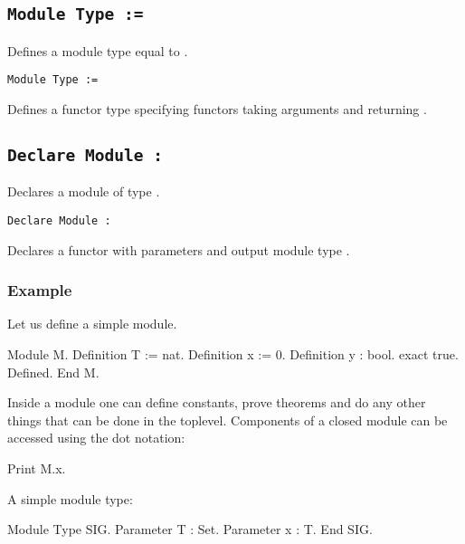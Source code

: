 \subsection{\tt Module Type {\ident} := {\modtype}}

Defines a module type {\ident} equal to {\modtype}.

\begin{Variants}
\item {\tt Module Type {\ident} {\modbindings} := {\modtype}}

  Defines a functor type {\ident} specifying functors taking arguments
  {\modbindings} and returning {\modtype}.
\end{Variants}

\subsection{\tt Declare Module {\ident} : {\modtype}}

Declares a module {\ident} of type {\modtype}.

\begin{Variants}

\item{\tt Declare Module {\ident} {\modbindings} \verb.:. {\modtype}}

  Declares a functor with parameters {\modbindings} and output module
  type {\modtype}.


\end{Variants}


\subsubsection{Example}

Let us define a simple module.
\begin{coq_example}
Module M.
  Definition T := nat.
  Definition x := 0.
  Definition y : bool.
    exact true.
  Defined.
End M.
\end{coq_example}
Inside a module one can define constants, prove theorems and do any
other things that can be done in the toplevel. Components of a closed
module can be accessed using the dot notation:
\begin{coq_example}
Print M.x.
\end{coq_example}
A simple module type:
\begin{coq_example}
Module Type SIG.
  Parameter T : Set.
  Parameter x : T.
End SIG.
\end{coq_example}

